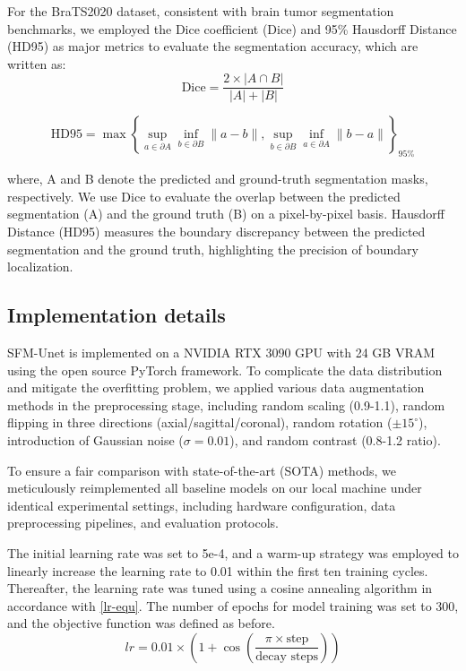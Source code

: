 \documentclass[AMA,Times1COL]{WileyNJDv5} %
\begin{document}
For the BraTS2020 dataset, consistent with brain tumor segmentation benchmarks\cite{menze2014multimodal,chen2024adaptive}, we employed the Dice coefficient (Dice) and 95\% Hausdorff Distance (HD95) as major metrics to evaluate the segmentation accuracy, which are written as:
\begin{equation}
    \mathrm{Dice}=\frac{2\times|A\cap B|}{|A|+|B|}
\end{equation}

\begin{equation}
\mathrm{HD95}=\max\left\{\sup_{a\in\partial A}\inf_{b\in\partial B}\|a-b\|,\sup_{b\in\partial B}\inf_{a\in\partial A}\|b-a\|\right\}_{95\%}
\end{equation}

where, A and B denote the predicted and ground-truth segmentation masks, respectively. We use Dice to evaluate the overlap between the predicted segmentation (A) and the ground truth (B) on a pixel-by-pixel basis. Hausdorff Distance (HD95) measures the boundary discrepancy between the predicted segmentation and the ground truth, highlighting the precision of boundary localization.

\subsection{Implementation details}
SFM-Unet is implemented on a NVIDIA RTX 3090 GPU with 24 GB VRAM using the open source PyTorch framework. To complicate the data distribution and mitigate the overfitting problem, we applied various data augmentation methods in the preprocessing stage, including random scaling (0.9-1.1), random flipping in three directions (axial/sagittal/coronal), random rotation ($\pm 15^\circ$), introduction of Gaussian noise ($\sigma = 0.01$), and random contrast (0.8-1.2 ratio). 

To ensure a fair comparison with state-of-the-art (SOTA) methods, we meticulously reimplemented all baseline models on our local machine under identical experimental settings, including hardware configuration, data preprocessing pipelines, and evaluation protocols. 

The initial learning rate was set to 5e-4, and a warm-up strategy was employed to linearly increase the learning rate to 0.01 within the first ten training cycles. Thereafter, the learning rate was tuned using a cosine annealing algorithm in accordance with \eqref{lr-equ}. The number of epochs for model training was set to 300, and the objective function was defined as before.
\begin{equation}
    \label{lr-equ}
    lr = 0.01 \times \left(1 + \cos\left(\frac{\pi \times \text{step}}{\text{decay steps}}\right)\right)
\end{equation}
\end{document}
